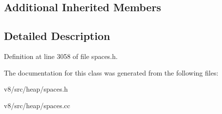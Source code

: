 \subsection*{Additional Inherited Members}


\subsection{Detailed Description}


Definition at line 3058 of file spaces.\+h.



The documentation for this class was generated from the following files\+:\begin{DoxyCompactItemize}
\item 
v8/src/heap/spaces.\+h\item 
v8/src/heap/spaces.\+cc\end{DoxyCompactItemize}
